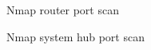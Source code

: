 \documentclass{article}
\begin{document}
\begin{figure}[!htb]
	\caption{Nmap router port scan}
\end{figure}

\begin{figure}[!htb]
	\caption{Nmap system hub port scan}
\end{figure}
\end{document}
